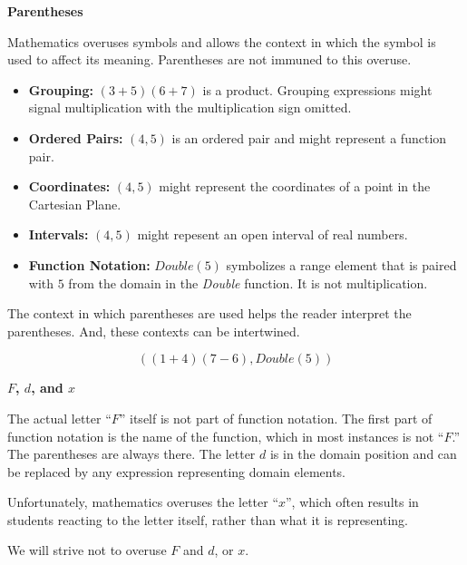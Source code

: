 \documentclass{ximera}
\begin{document}
\begin{notation}  \textbf{\textcolor{red!50!green}{Parentheses}}  

Mathematics overuses symbols and allows the context in which the symbol is used to affect its meaning. Parentheses are not immuned to this overuse.

	\begin{itemize}
		\item \textbf{Grouping:} $(3+5)(6+7)$ is a product.  Grouping expressions might signal multiplication with the multiplication sign omitted.
		\item \textbf{Ordered Pairs:} $(4, 5)$ is an ordered pair and might represent a function pair.
		\item \textbf{Coordinates:} $(4, 5)$ might represent the coordinates of a point in the Cartesian Plane.
		\item \textbf{Intervals:} $(4, 5)$ might repesent an open interval of real numbers.
		\item \textbf{Function Notation:} $Double(5)$ symbolizes a range element that is paired with $5$ from the domain in the \textit{Double} function. It is not multiplication.
	\end{itemize}


The context in which parentheses are used helps the reader interpret the parentheses.  And, these contexts can be intertwined.

\[  ((1+4)(7-6), Double(5))    \]
\end{notation}




\begin{warning} \textbf{\textcolor{red!70!black}{$F$, $d$, and $x$}} 


The actual letter ``$F$'' itself is not part of function notation.  The first part of function notation is the name of the function, which in most instances is not ``$F$.'' The parentheses are always there.  The letter $d$ is in the domain position and can be replaced by any expression representing domain elements.  


Unfortunately, mathematics overuses the letter ``$x$'', which often results in students reacting to the letter itself, rather than what it is representing.

We will strive not to overuse $F$ and $d$, or $x$.
\end{warning}
\end{document}
